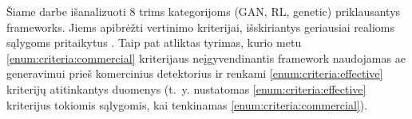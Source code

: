 
Šiame darbe išanalizuoti 8 trims kategorijoms (\acs{GAN}, \acs{RL}, \acs{genetic}) priklausantys  \glspl{framework}. Jiems apibrėžti vertinimo kriterijai, išskiriantys geriausiai realioms sąlygoms pritaikytus . Taip pat atliktas tyrimas, kurio metu \ref{enum:criteria:commercial} kriterijaus neįgyvendinantis \gls{framework}  naudojamas \acs{ae} generavimui prieš komercinius detektorius ir renkami \ref{enum:criteria:effective} kriterijų atitinkantys duomenys (t.~y. nustatomas  \ref{enum:criteria:effective} kriterijus tokiomis sąlygomis, kai tenkinamas \ref{enum:criteria:commercial}).